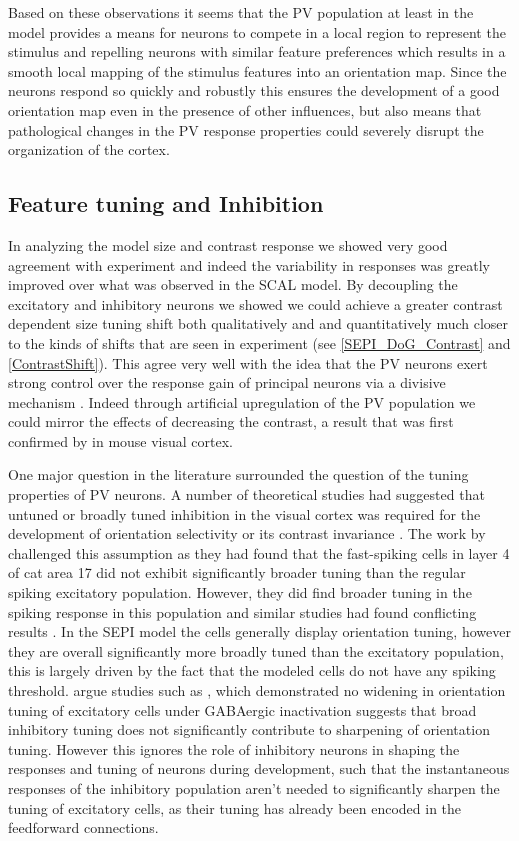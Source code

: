 Based on these observations it seems that the PV population at least
in the model provides a means for neurons to compete in a local region
to represent the stimulus and repelling neurons with similar feature
preferences which results in a smooth local mapping of the stimulus
features into an orientation map. Since the neurons respond so quickly
and robustly this ensures the development of a good orientation map
even in the presence of other influences, but also means that
pathological changes in the PV response properties could severely
disrupt the organization of the cortex.

\subsection{Feature tuning and Inhibition}

In analyzing the model size and contrast response we showed very good
agreement with experiment and indeed the variability in responses was
greatly improved over what was observed in the SCAL model. By
decoupling the excitatory and inhibitory neurons we showed we could
achieve a greater contrast dependent size tuning shift both
qualitatively and and quantitatively much closer to the kinds of
shifts that are seen in experiment (see \ref{SEPI_DoG_Contrast} and
\ref{ContrastShift}). This agree very well with the idea that the PV
neurons exert strong control over the response gain of principal
neurons via a divisive mechanism \citep{Wilson2012}. Indeed through
artificial upregulation of the PV population we could mirror the
effects of decreasing the contrast, a result that was first confirmed
by \cite{Nienborg2013} in mouse visual cortex.

One major question in the literature surrounded the question of the
tuning properties of PV neurons. A number of theoretical studies had
suggested that untuned or broadly tuned inhibition in the visual
cortex was required for the development of orientation selectivity or
its contrast invariance \citep{Somers1995, Troyer1998}. The work by
\cite{Cardin2007} challenged this assumption as they had found that
the fast-spiking cells in layer 4 of cat area 17 did not exhibit
significantly broader tuning than the regular spiking excitatory
population. However, they did find broader tuning in the spiking
response in this population and similar studies had found conflicting
results \citep{Hirsch2003, Nowak2008}. In the SEPI model the cells
generally display orientation tuning, however they are overall
significantly more broadly tuned than the excitatory population, this
is largely driven by the fact that the modeled cells do not have any
spiking threshold. \cite{Cardin2007} argue studies such as
\cite{Nelson1994}, which demonstrated no widening in orientation
tuning of excitatory cells under GABAergic inactivation suggests that
broad inhibitory tuning does not significantly contribute to
sharpening of orientation tuning. However this ignores the role of
inhibitory neurons in shaping the responses and tuning of neurons
during development, such that the instantaneous responses of the
inhibitory population aren't needed to significantly sharpen the
tuning of excitatory cells, as their tuning has already been encoded
in the feedforward connections.

